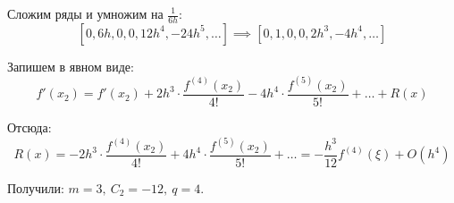 \documentclass[14pt, a4paper, titlepage, fleqn]{extarticle}
\begin{document}
        Сложим ряды и умножим на \( \displaystyle \frac{1}{6h} \):
        \[
            \left[0, 6h, 0, 0, 12h^4, -24h^5, \dots\right] \implies \left[0, 1, 0, 0, 2h^3, -4h^4, \dots\right]
        \]

        Запишем в явном виде:
        \[
            f'(x_2) = f'(x_2) + 2h^3 \cdot \frac{f^{(4)}(x_2)}{4!} - 4h^4 \cdot \frac{f^{(5)}(x_2)}{5!} + \dots + R(x)
        \]

        Отсюда:
        \[
            R(x) = -2h^3 \cdot \frac{f^{(4)}(x_2)}{4!} + 4h^4 \cdot \frac{f^{(5)}(x_2)}{5!} + \dots = -\frac{h^3}{12} f^{(4)}(\xi) + O(h^4)
        \]

        Получили: \( m = 3, ~ C_2 = -12, ~ q = 4 \).
\end{document}
